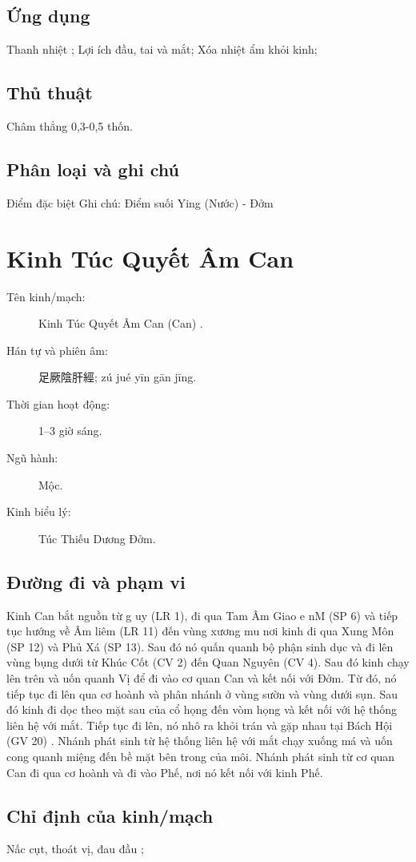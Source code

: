 \documentclass[12pt,a4paper]{article}
\begin{document}
\subsection*{Ứng dụng}Thanh nhiệt ; Lợi ích đầu, tai và mắt; Xóa nhiệt ẩm khỏi kinh;
\subsection*{Thủ thuật}Châm thẳng 0,3-0,5 thốn.
\subsection*{Phân loại và ghi chú}Điểm đặc biệt Ghi chú: Điểm suối Ying (Nước) - Đởm

\clearpage
\section{Kinh Túc Quyết Âm Can}
\begin{description}
\item[Tên kinh/mạch:] Kinh Túc Quyết Âm Can (Can) .
\item[Hán tự và phiên âm:] 足厥陰肝經; zú jué yīn gān jīng.
\item[Thời gian hoạt động:] 1--3 giờ sáng.
\item[Ngũ hành:] Mộc.
\item[Kinh biểu lý:] Túc Thiếu Dương Đởm.
\end{description}
\subsection*{Đường đi và phạm vi}Kinh Can bắt nguồn từ g uy (LR 1), đi qua Tam Âm Giao e nM (SP 6) và tiếp tục hướng về Âm liêm (LR 11) đến vùng xương mu nơi kinh đi qua Xung Môn (SP 12) và Phủ Xá (SP 13). Sau đó nó quấn quanh bộ phận sinh dục và đi lên vùng bụng dưới từ Khúc Cốt (CV 2) đến Quan Nguyên (CV 4). Sau đó kinh chạy lên trên và uốn quanh Vị để đi vào cơ quan Can và kết nối với Đởm. Từ đó, nó tiếp tục đi lên qua cơ hoành và phân nhánh ở vùng sườn và vùng dưới sụn. Sau đó kinh đi dọc theo mặt sau của cổ họng đến vòm họng và kết nối với hệ thống liên hệ với mắt. Tiếp tục đi lên, nó nhô ra khỏi trán và gặp nhau tại Bách Hội (GV 20) . Nhánh phát sinh từ hệ thống liên hệ với mắt chạy xuống má và uốn cong quanh miệng đến bề mặt bên trong của môi. Nhánh phát sinh từ cơ quan Can đi qua cơ hoành và đi vào Phế, nơi nó kết nối với kinh Phế.
\subsection*{Chỉ định của kinh/mạch}Nấc cụt, thoát vị, đau đầu ;
\end{document}
